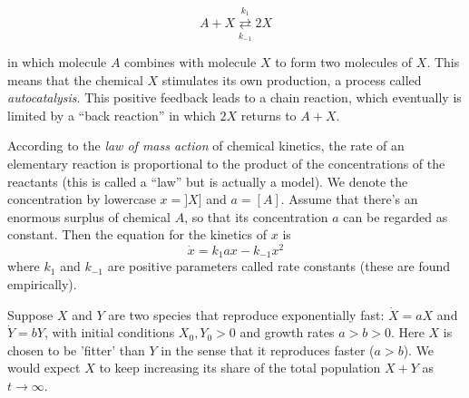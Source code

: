 \documentclass[12pt,letterpaper,noanswers]{exam}
\begin{document}
\begin{questions}
\[A+X \overset{k_1}{\underset{k_{-1}}\rightleftarrows} 2X\]

in which molecule $A$ combines with molecule $X$ to form two molecules of $X$.  This means that the chemical $X$ stimulates its own production, a process called \emph{autocatalysis}.  This positive feedback leads to a chain reaction, which eventually is limited by a ``back reaction'' in which $2X$ returns to $A+X$.  

According to the \emph{law of mass action} of chemical kinetics, the rate of an elementary reaction is proportional to the product of the concentrations of the reactants (this is called a ``law'' but is actually a model).  We denote the concentration by lowercase $x=]X]$ and $a=[A]$.  Assume that there's an enormous surplus of chemical $A$, so that its concentration $a$ can be regarded as constant.  Then the equation for the kinetics of $x$ is 
\[\dot{x} = k_1 a x - k_{-1}x^2\] where $k_1$ and $k_{-1}$ are positive parameters called rate constants (these are found empirically).

\question Suppose $X$ and $Y$ are two species that reproduce exponentially fast: $\dot X = aX$ and $\dot Y = bY$, with initial conditions $X_0, Y_0 > 0$ and growth rates $a > b> 0$.  Here $X$ is chosen to be 'fitter' than $Y$ in the sense that it reproduces faster ($a>b$).  We would expect $X$ to keep increasing its share of the total population $X+Y$ as $t\rightarrow \infty$.  


\end{questions}
\end{document}
